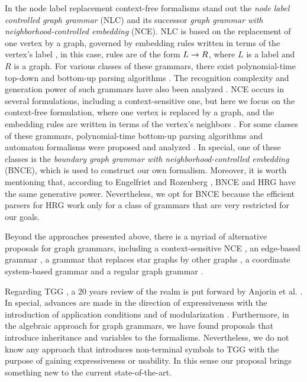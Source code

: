 In the node label replacement context-free formalisms stand out the  \textit{node label controlled graph grammar} (NLC) and its successor \textit{graph grammar with neighborhood-controlled embedding} (NCE). NLC is based on the replacement of one vertex by a graph, governed by embedding rules written in terms of the vertex's label \cite{rozenberg1986boundary}, in this case, rules are of the form $L \to R$, where $L$ is a label and $R$ is a graph. For various classes of these grammars, there exist polynomial-time top-down and bottom-up parsing algorithms \cite{flasinski1993parsing,flasinski2014characteristics, rozenberg1986boundary, wanke1991algorithms}. The recognition complexity and generation power of such grammars have also been analyzed \cite{flasinski1998power,kim2012structure}. NCE occurs in several formulations, including a context-sensitive one, but here we focus on the context-free formulation, where one vertex is replaced by a graph, and the embedding rules are written in terms of the vertex's neighbors \cite{janssens1982graph,skodinis1998neighborhood}. For some classes of these grammars, polynomial-time bottom-up parsing algorithms and automaton formalisms were proposed and analyzed \cite{kim2001efficient,brandenburg2005finite}. In special, one of these classes is the \textit{boundary graph grammar with neighborhood-controlled embedding} (BNCE), which is used to construct our own formalism. Moreover, it is worth mentioning that, according to Engelfriet and Rozenberg \cite{engelfiet1990comparison}, BNCE and HRG have the same generative power. Nevertheless, we opt for BNCE because the efficient parsers for HRG \cite{drewes2015predictive, drewes2017predictive} work only for a class of grammars that are very restricted for our goals.

Beyond the approaches presented above, there is a myriad of alternative proposals for graph grammars, including a context-sensitive NCE \cite{adachi1999nce}, an edge-based grammar \cite{shi2015method}, a grammar that replaces star graphs by other graphs \cite{drewes2010adaptive}, a coordinate system-based grammar \cite{kong2006spatial} and a regular graph grammar \cite{gilroy2017parsing}.

Regarding TGG \cite{schurr1994specification}, a 20 years review of the realm is put forward by Anjorin et al. \cite{anjorin201620}. In special, advances are made in the direction of expressiveness with the introduction of application conditions \cite{klar2010extended} and of modularization \cite{anjorin2014modularizing}. Furthermore, in the algebraic approach for graph grammars, we have found proposals that introduce inheritance \cite{bardohl2004integrating,hermann2008typed} and variables \cite{hoffmann2005graph} to the formalisms. Nevertheless, we do not know any approach that introduces non-terminal symbols to TGG with the purpose of gaining expressiveness or usability. In this sense our proposal brings something new to the current state-of-the-art.
